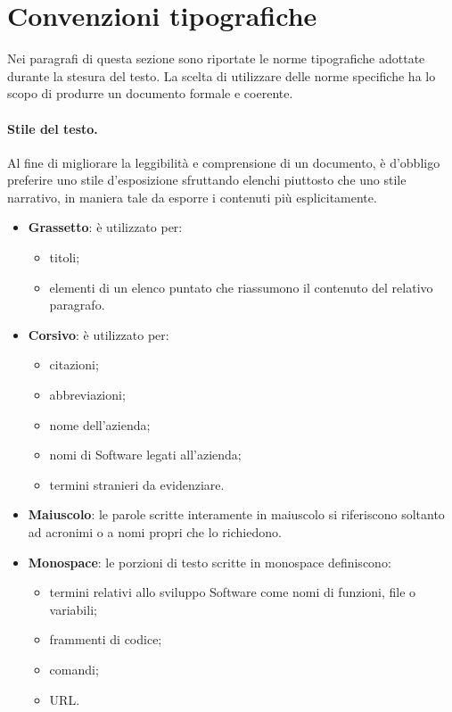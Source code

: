 \section{Convenzioni tipografiche}

Nei paragrafi di questa sezione sono riportate le norme tipografiche adottate durante la stesura del testo. La scelta di utilizzare delle norme specifiche ha lo scopo di produrre un documento formale e coerente.

\paragraph{Stile del testo.}Al fine di migliorare la leggibilità e comprensione di un documento, è d'obbligo preferire uno stile d'esposizione sfruttando elenchi piuttosto che uno stile narrativo, in maniera tale da esporre i contenuti più esplicitamente.
\begin{itemize}
	\item \textbf{Grassetto}: è utilizzato per:
	\begin{itemize}
		\item titoli;
		\item elementi di un elenco puntato che riassumono il contenuto del relativo paragrafo.
	\end{itemize}
	\item \textbf{Corsivo}: è utilizzato per:
	\begin{itemize}
		\item citazioni;
		\item abbreviazioni;
		\item nome dell'azienda;
		\item nomi di Software legati all'azienda;
		\item termini stranieri da evidenziare.
	\end{itemize}
	\item \textbf{Maiuscolo}: le parole scritte interamente in maiuscolo si riferiscono soltanto ad acronimi o a nomi propri che lo richiedono.
	\item \textbf{Monospace}: le porzioni di testo scritte in monospace definiscono:
	\begin{itemize}
		\item termini relativi allo sviluppo Software come nomi di funzioni, file o variabili;
		\item frammenti di codice;
		\item comandi;
		\item \gls{URL}.
	\end{itemize}
\end{itemize}

